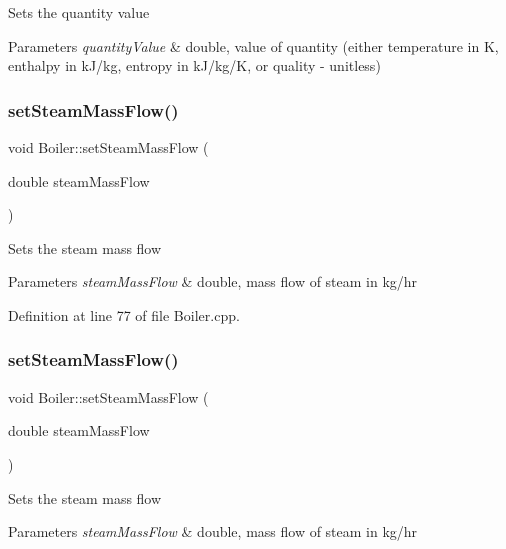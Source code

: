 Sets the quantity value 
\begin{DoxyParams}{Parameters}
{\em quantity\+Value} & double, value of quantity (either temperature in K, enthalpy in k\+J/kg, entropy in k\+J/kg/K, or quality -\/ unitless) \\
\hline
\end{DoxyParams}
\mbox{\label{class_boiler_ada7af5896a2a4701d78a532dc9bc9892}} 
\subsubsection{\texorpdfstring{set\+Steam\+Mass\+Flow()}{setSteamMassFlow()}\hspace{0.1cm}{\footnotesize\ttfamily [1/3]}}
{\footnotesize\ttfamily void Boiler\+::set\+Steam\+Mass\+Flow (\begin{DoxyParamCaption}\item[{double}]{steam\+Mass\+Flow }\end{DoxyParamCaption})}

Sets the steam mass flow 
\begin{DoxyParams}{Parameters}
{\em steam\+Mass\+Flow} & double, mass flow of steam in kg/hr \\
\hline
\end{DoxyParams}


Definition at line 77 of file Boiler.\+cpp.

\mbox{\label{class_boiler_ada7af5896a2a4701d78a532dc9bc9892}} 
\subsubsection{\texorpdfstring{set\+Steam\+Mass\+Flow()}{setSteamMassFlow()}\hspace{0.1cm}{\footnotesize\ttfamily [2/3]}}
{\footnotesize\ttfamily void Boiler\+::set\+Steam\+Mass\+Flow (\begin{DoxyParamCaption}\item[{double}]{steam\+Mass\+Flow }\end{DoxyParamCaption})}

Sets the steam mass flow 
\begin{DoxyParams}{Parameters}
{\em steam\+Mass\+Flow} & double, mass flow of steam in kg/hr \\
\hline
\end{DoxyParams}
\mbox{\label{class_boiler_ada7af5896a2a4701d78a532dc9bc9892}} 
